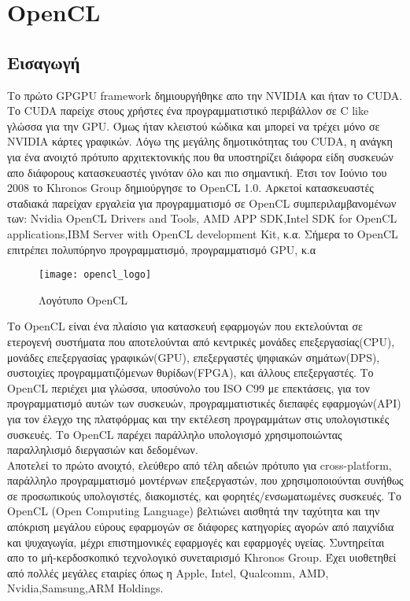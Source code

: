 \section{OpenCL}
\subsection{Εισαγωγή}
Το πρώτο GPGPU framework δημιουργήθηκε απο την NVIDIA και ήταν το CUDA. Το CUDA παρείχε στους χρήστες ένα προγραμματιστικό περιβάλλον σε C like γλώσσα για την GPU. Όμως ήταν κλειστού κώδικα και μπορεί να τρέχει μόνο σε NVIDIA κάρτες γραφικών. Λόγω της μεγάλης δημοτικότητας του CUDA, η ανάγκη για ένα ανοιχτό πρότυπο αρχιτεκτονικής που θα υποστηρίζει διάφορα είδη συσκευών απο διάφορους κατασκευαστές γινόταν όλο και πιο σημαντική. Έτσι τον Ιούνιο του 2008 το Khronos Group δημιούργησε το OpenCL 1.0. Αρκετοί κατασκευαστές σταδιακά παρείχαν εργαλεία για προγραμματισμό σε OpenCL συμπεριλαμβανομένων των: Nvidia OpenCL Drivers and Tools, AMD APP SDK,Intel SDK for OpenCL applications,IBM Server with OpenCL development Kit, κ.α. Σήμερα το OpenCL επιτρέπει πολυπύρηνο προγραμματισμό, προγραμματισμό GPU, κ.α \cite{opencl-1}   


\begin{figure}[h]
	\texttt{[image: opencl\_logo]}
	\centering
	\caption{Λογότυπο OpenCL\cite{figure-4}}
\end{figure}

Το OpenCL είναι ένα πλαίσιο για κατασκευή εφαρμογών που εκτελούνται σε ετερογενή συστήματα που αποτελούνται από κεντρικές μονάδες επεξεργασίας(CPU), μονάδες επεξεργασίας γραφικών(GPU), επεξεργαστές ψηφιακών σημάτων(DPS), συστοιχίες προγραμματιζόμενων θυρίδων(FPGA), και άλλους επεξεργαστές. Το OpenCL περιέχει μια γλώσσα, υποσύνολο του ISO C99 με επεκτάσεις, για τον προγραμματισμό αυτών των συσκευών, προγραμματιστικές διεπαφές εφαρμογών(API) για τον έλεγχο της πλατφόρμας και την εκτέλεση προγραμμάτων στις υπολογιστικές συσκευές. Το OpenCL παρέχει παράλληλο υπολογισμό χρησιμοποιώντας παραλληλισμό διεργασιών και δεδομένων.\\
Αποτελεί το πρώτο ανοιχτό, ελεύθερο από τέλη αδειών πρότυπο για cross-platform, παράλληλο προγραμματισμό μοντέρνων επεξεργαστών, που χρησιμοποιούνται συνήθως σε προσωπικούς υπολογιστές, διακομιστές, και φορητές/ενσωματωμένες συσκευές. Το OpenCL (Open Computing Language) βελτιώνει αισθητά την ταχύτητα και την απόκριση μεγάλου εύρους εφαρμογών σε διάφορες κατηγορίες αγορών από παιχνίδια και ψυχαγωγία, μέχρι επιστημονικές εφαρμογές και εφαρμογές υγείας. Συντηρείται απο το μή-κερδοσκοπικό τεχνολογικό συνεταιρισμό Khronos Group. Έχει υιοθετηθεί από πολλές μεγάλες εταιρίες όπως η Apple, Intel, Qualcomm, AMD, Nvidia,Samsung,ARM Holdings.

